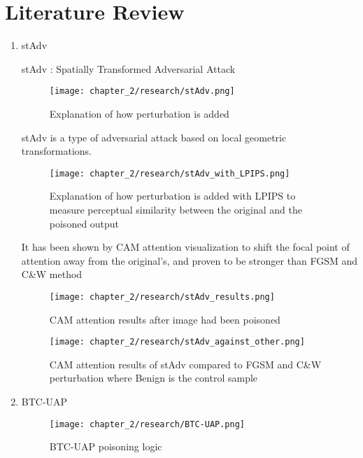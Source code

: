 \section{Literature Review}
\label{section:literature-review}

\begin{enumerate}
    \item stAdv
        
    \par stAdv : Spatially Transformed Adversarial Attack
    \begin{figure}[h]
        \centering
        \texttt{[image: chapter\_2/research/stAdv.png]}
        \caption{Explanation of how perturbation is added}
    
    \end{figure}

    stAdv is a type of adversarial attack based on local geometric transformations.
    \begin{figure}[h]
        \centering
        \texttt{[image: chapter\_2/research/stAdv\_with\_LPIPS.png]}
        \caption{Explanation of how perturbation is added with LPIPS to measure perceptual similarity between the original and the poisoned output}
    
    \end{figure}

    It has been shown by CAM attention visualization to shift the focal point of attention away from the original's, and proven to be stronger than FGSM and C\&W method
    \begin{figure}[h]
        \centering
        \texttt{[image: chapter\_2/research/stAdv\_results.png]}
        \caption{CAM attention results after image had been poisoned}
    
    \end{figure}
    \begin{figure}[h]
        \centering
        \texttt{[image: chapter\_2/research/stAdv\_against\_other.png]}
        \caption{CAM attention results of stAdv compared to FGSM and C\&W perturbation where Benign is the control sample}
    
    \end{figure}

    \clearpage

    \item BTC-UAP
    \begin{figure}[h]
        \centering
        \texttt{[image: chapter\_2/research/BTC-UAP.png]}
        \caption{BTC-UAP poisoning logic}
    

\end{figure}
\end{enumerate}
